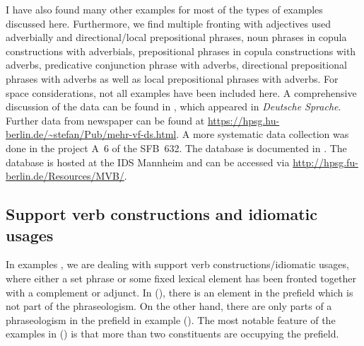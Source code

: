 I have also found many other examples for most of the types of examples discussed here. Furthermore, we find multiple fronting
with adjectives used adverbially and directional/local prepositional phrases, noun phrases in copula constructions with adverbials, 
prepositional phrases in copula constructions with adverbs, predicative conjunction phrase with adverbs, directional prepositional 
phrases with adverbs as well as local prepositional phrases with adverbs. For space considerations, not all examples have been included
here. A comprehensive discussion of the data can be found in \citep{Mueller2003b}, which appeared in \emph{Deutsche Sprache}.
Further data from newspaper can be found at
\url{https://hpsg.hu-berlin.de/~stefan/Pub/mehr-vf-ds.html}. A more systematic data collection was
done in the project A~6 of the SFB~632. The database is documented in . The
database is hosted at the IDS Mannheim and can be accessed via \url{http://hpsg.fu-berlin.de/Resources/MVB/}.



\subsection{Support verb constructions and idiomatic usages}
\label{sec-phraseolog}

In examples , we are dealing with support verb constructions/idiomatic usages, where
either a set phrase or some fixed lexical element has been fronted together with a complement or adjunct.
In (), there is an element in the prefield which is not part of the phraseologism. On the
other hand, there are only parts of a phraseologism in the prefield in example (). The most notable feature of the examples in 
() is that more than two constituents are occupying the prefield.



